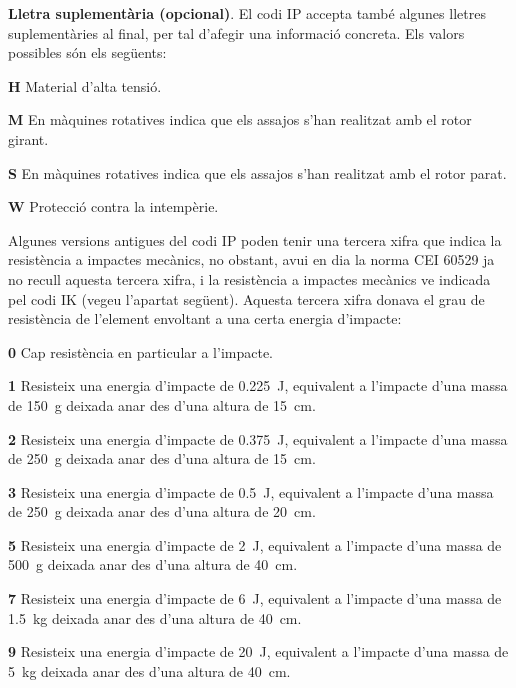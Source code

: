 \textbf{Lletra suplementària (opcional)}. El codi IP accepta també algunes
lletres suplementàries al final, per tal d'afegir una informació concreta. Els valors
possibles són els següents:
\begin{list}{}
   {\setlength{\labelwidth}{10mm} \setlength{\leftmargin}{10mm} \setlength{\labelsep}{2mm}}
   \item[\textbf{H}] Material d'alta tensió.
   \item[\textbf{M}] En màquines rotatives indica que els assajos s'han realitzat amb el
    rotor girant.
   \item[\textbf{S}] En màquines rotatives indica que els assajos s'han realitzat amb el
    rotor parat.
   \item[\textbf{W}] Protecció contra la intempèrie.
\end{list}


Algunes versions antigues del codi IP poden tenir una tercera xifra que indica la resistència a impactes mecànics, no obstant, avui en dia la norma CEI 60529 ja no recull aquesta tercera xifra, i la resistència a impactes mecànics ve indicada pel codi IK (vegeu l'apartat següent). Aquesta tercera xifra donava el grau de resistència de l'element envoltant a una certa energia d'impacte:
\begin{list}{}
   {\setlength{\labelwidth}{10mm} \setlength{\leftmargin}{10mm} \setlength{\labelsep}{2mm}}
   \item[\textbf{0}] Cap resistència en particular a l'impacte.
   \item[\textbf{1}] Resisteix una energia d'impacte de \SI{0,225}{J}, equivalent a l'impacte d'una massa de \SI{150}{g} deixada anar des d'una altura de \SI{15}{cm}.
   \item[\textbf{2}] Resisteix una energia d'impacte de \SI{0,375}{J}, equivalent a l'impacte d'una massa de \SI{250}{g} deixada anar des d'una altura de \SI{15}{cm}.
   \item[\textbf{3}] Resisteix una energia d'impacte de \SI{0,5}{J}, equivalent a l'impacte d'una massa de \SI{250}{g} deixada anar des d'una altura de \SI{20}{cm}.
   \item[\textbf{5}] Resisteix una energia d'impacte de \SI{2}{J}, equivalent a l'impacte d'una massa de \SI{500}{g} deixada anar des d'una altura de \SI{40}{cm}.
   \item[\textbf{7}] Resisteix una energia d'impacte de \SI{6}{J}, equivalent a l'impacte d'una massa de \SI{1,5}{kg} deixada anar des d'una altura de \SI{40}{cm}.
   \item[\textbf{9}]Resisteix una energia d'impacte de \SI{20}{J}, equivalent a l'impacte d'una massa de \SI{5}{kg} deixada anar des d'una altura de \SI{40}{cm}.
\end{list}

